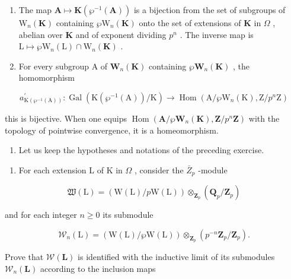 \begin{enumerate}
\def\labelenumi{(\roman{enumi})}
\setcounter{enumi}{2}
\item
  The map \(\mathbf{A} \mapsto \mathbf{K}(\wp^{-1}(\mathbf{A}))\) is a bijection from the set of subgroups of \(\mathrm{W}_n(\mathbf{K})\) containing \(\wp\mathrm{W}_n(\mathbf{K})\) onto the set of extensions of \(\mathbf{K}\) in \(\Omega\) , abelian over \(\mathbf{K}\) and of exponent dividing \(p^n\) . The inverse map is \(\mathrm{L} \mapsto \wp\mathrm{W}_n(\mathrm{L}) \cap \mathrm{W}_n(\mathbf{K})\) .
\item
  For every subgroup A of \(\mathbf{W}_{n}(\mathbf{K})\) containing \(\wp\mathbf{W}_{n}(\mathbf{K})\) , the homomorphism
\end{enumerate}

\[
a _ {\mathrm{K} (\wp ^ {- 1} (\mathrm{A}))} ^ {\prime}: \operatorname{Gal} \left(\mathrm{K} \left(\wp ^ {- 1} (\mathrm{A})\right) / \mathrm{K}\right)\rightarrow \operatorname{Hom} \left(\mathrm{A} / \wp \mathrm{W} _ {n} (\mathrm{K}), \mathrm{Z} / p ^ {n} \mathrm{Z}\right)
\]

this is bijective. When one equips \(\operatorname{Hom}(\mathbf{A}/\wp\mathbf{W}_n(\mathbf{K}), \mathbf{Z}/p^n\mathbf{Z})\) with the topology of pointwise convergence, it is a homeomorphism.

\begin{enumerate}
\def\labelenumi{\arabic{enumi})}
\setcounter{enumi}{19}
\tightlist
\item
  Let us keep the hypotheses and notations of the preceding exercise.
\end{enumerate}

\begin{enumerate}
\def\labelenumi{\alph{enumi})}
\tightlist
\item
  For each extension L of K in \(\Omega\) , consider the \(\bar{Z}_{p}\) -module
\end{enumerate}

\[
\mathfrak {W} (\mathrm{L}) = \left(\mathrm{W} (\mathrm{L}) / p \mathrm{W} (\mathrm{L})\right) \otimes_ {\mathbf {Z} _ {p}} \left(\mathbf {Q} _ {p} / \mathbf {Z} _ {p}\right)
\]

and for each integer \(n \geqslant 0\) its submodule

\[
\mathcal {W} _ {n} (\mathrm{L}) = \left(\mathrm{W} (\mathrm{L}) / \wp \mathrm{W} (\mathrm{L})\right) \otimes_ {\mathbf {Z} _ {p}} \left(p ^ {- n} \mathbf {Z} _ {p} / \mathbf {Z} _ {p}\right).
\]

Prove that \(\mathcal{W}(\mathbf{L})\) is identified with the inductive limit of its submodules \(\mathcal{W}_{n}(\mathbf{L})\) according to the inclusion maps

